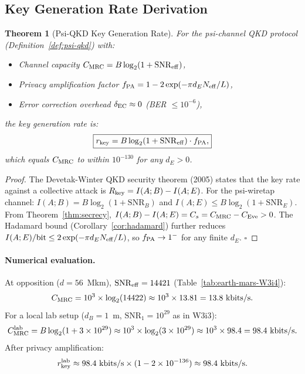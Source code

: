 \documentclass[aps,prd,twocolumn,superscriptaddress,nofootinbib]{revtex4-2}
\newcommand{\SNR}{\mathrm{SNR}}
\newtheorem{theorem}{Theorem}
\begin{document}
\subsection{Key Generation Rate Derivation}

\begin{theorem}[Psi-QKD Key Generation Rate]
\label{thm:qkd-rate}
For the psi-channel QKD protocol (Definition~\ref{def:psi-qkd}) with:
\begin{itemize}
\item Channel capacity $C_{\rm MRC} = B\log_2(1 + \SNR_{\rm eff})$,
\item Privacy amplification factor $f_{\rm PA} = 1 - 2\exp(-\pi d_E N_{\rm eff}/L)$,
\item Error correction overhead $\delta_{\rm EC} \approx 0$ (BER $\leq 10^{-6}$),
\end{itemize}
the key generation rate is:
\begin{equation}
\boxed{
r_{\rm key} = B\log_2(1 + \SNR_{\rm eff}) \cdot f_{\rm PA},
}
\label{eq:r-key}
\end{equation}
which equals $C_{\rm MRC}$ to within $10^{-130}$ for any $d_E > 0$.
\end{theorem}

\begin{proof}
The Devetak-Winter QKD security theorem (2005) states that the key rate
against a collective attack is $R_{\rm key} = I(A;B) - I(A;E)$.
For the psi-wiretap channel: $I(A;B) = B\log_2(1+\SNR_B)$ and
$I(A;E) \leq B\log_2(1+\SNR_E)$. From Theorem~\ref{thm:secrecy},
$I(A;B) - I(A;E) = C_s = C_{\rm MRC} - C_{\rm Eve} > 0$.
The Hadamard bound (Corollary~\ref{cor:hadamard}) further reduces
$I(A;E)/\text{bit} \leq 2\exp(-\pi d_E N_{\rm eff}/L)$, so
$f_{\rm PA} \to 1^-$ for any finite $d_E$. $\square$
\end{proof}

\paragraph{Numerical evaluation.}
At opposition ($d = 56$~Mkm), $\SNR_{\rm eff} = 14421$ (Table~\ref{tab:earth-mars-W3i4}):
\begin{equation}
C_{\rm MRC} = 10^3 \times \log_2(14422) \approx 10^3 \times 13.81
= 13.8~\text{kbits/s}.
\label{eq:C-MRC-opp}
\end{equation}
For a local lab setup ($d_B = 1$~m, $\SNR_1 = 10^{29}$ as in W3i3):
\begin{equation}
C_{\rm MRC}^{\rm lab} = B\log_2(1 + 3\times10^{29})
\approx 10^3 \times \log_2(3\times10^{29}) \approx 10^3 \times 98.4
= 98.4~\text{kbits/s}.
\label{eq:C-MRC-lab}
\end{equation}
After privacy amplification:
\begin{equation}
r_{\rm key}^{\rm lab} \approx 98.4~\text{kbits/s} \times (1 - 2\times10^{-136})
\approx 98.4~\text{kbits/s}.
\end{equation}
\end{document}

